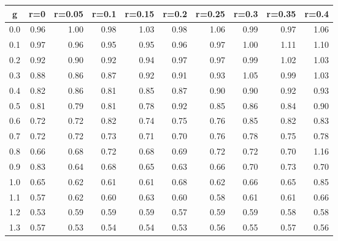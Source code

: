 %
\begin{table}[!tbp]
 \begin{center}
 \begin{tabular}{rrrrrrrrrr}\hline\hline
\multicolumn{1}{c}{g}&\multicolumn{1}{c}{r=0}&\multicolumn{1}{c}{r=0.05}&\multicolumn{1}{c}{r=0.1}&\multicolumn{1}{c}{r=0.15}&\multicolumn{1}{c}{r=0.2}&\multicolumn{1}{c}{r=0.25}&\multicolumn{1}{c}{r=0.3}&\multicolumn{1}{c}{r=0.35}&\multicolumn{1}{c}{r=0.4}\tabularnewline
\hline
0.0&0.96&1.00&0.98&1.03&0.98&1.06&0.99&0.97&1.06\tabularnewline
0.1&0.97&0.96&0.95&0.95&0.96&0.97&1.00&1.11&1.10\tabularnewline
0.2&0.92&0.90&0.92&0.94&0.97&0.97&0.99&1.02&1.03\tabularnewline
0.3&0.88&0.86&0.87&0.92&0.91&0.93&1.05&0.99&1.03\tabularnewline
0.4&0.82&0.86&0.81&0.85&0.87&0.90&0.90&0.92&0.93\tabularnewline
0.5&0.81&0.79&0.81&0.78&0.92&0.85&0.86&0.84&0.90\tabularnewline
0.6&0.72&0.72&0.82&0.74&0.75&0.76&0.85&0.82&0.83\tabularnewline
0.7&0.72&0.72&0.73&0.71&0.70&0.76&0.78&0.75&0.78\tabularnewline
0.8&0.66&0.68&0.72&0.68&0.69&0.72&0.72&0.70&1.16\tabularnewline
0.9&0.83&0.64&0.68&0.65&0.63&0.66&0.70&0.73&0.70\tabularnewline
1.0&0.65&0.62&0.61&0.61&0.68&0.62&0.66&0.65&0.85\tabularnewline
1.1&0.57&0.62&0.60&0.63&0.60&0.58&0.61&0.61&0.66\tabularnewline
1.2&0.53&0.59&0.59&0.59&0.57&0.59&0.59&0.58&0.58\tabularnewline
1.3&0.57&0.53&0.54&0.54&0.53&0.56&0.55&0.57&0.56\tabularnewline
\hline
\end{tabular}

\end{center}

\end{table}


